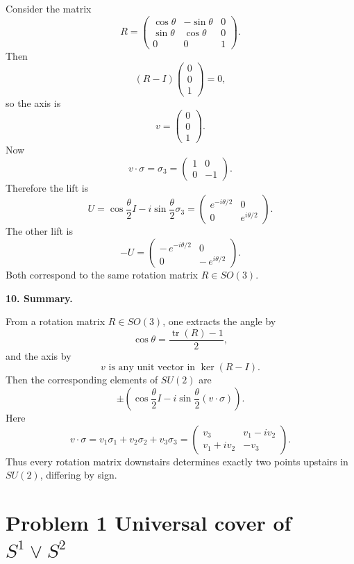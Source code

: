 \documentclass[12pt,a4paper]{article}
\theoremstyle{notespace}
\begin{document}
Consider the matrix
\[
R=
\begin{pmatrix}
	\cos\theta & -\sin\theta & 0\\
	\sin\theta & \cos\theta & 0\\
	0&0&1
\end{pmatrix}.
\]
Then
\[
(R-I)
\begin{pmatrix}
	0\\
	0\\
	1
\end{pmatrix}
=0,
\]
so the axis is
\[
v=
\begin{pmatrix}
	0\\
	0\\
	1
\end{pmatrix}.
\]
Now
\[
v\cdot \sigma = \sigma_3=
\begin{pmatrix}
	1&0\\
	0&-1
\end{pmatrix}.
\]
Therefore the lift is
\[
U=
\cos\frac{\theta}{2}I-i\sin\frac{\theta}{2}\sigma_3
=
\begin{pmatrix}
	e^{-i\theta/2} & 0\\
	0 & e^{i\theta/2}
\end{pmatrix}.
\]
The other lift is
\[
-U=
\begin{pmatrix}
	-\,e^{-i\theta/2} & 0\\
	0 & -\,e^{i\theta/2}
\end{pmatrix}.
\]
Both correspond to the same rotation matrix \(R\in SO(3)\).

\medskip

\textbf{10. Summary.}

From a rotation matrix \(R\in SO(3)\), one extracts the angle by
\[
\boxed{\cos\theta=\frac{\operatorname{tr}(R)-1}{2}},
\]
and the axis by
\[
\boxed{v\text{ is any unit vector in }\ker(R-I).}
\]
Then the corresponding elements of \(SU(2)\) are
\[
\boxed{
	\pm\left(
	\cos\frac{\theta}{2}I
	-
	i\sin\frac{\theta}{2}(v\cdot \sigma)
	\right).
}
\]
Here
\[
\boxed{
	v\cdot \sigma=v_1\sigma_1+v_2\sigma_2+v_3\sigma_3
	=
	\begin{pmatrix}
		v_3 & v_1-i v_2\\
		v_1+i v_2 & -v_3
	\end{pmatrix}.
}
\]
Thus every rotation matrix downstairs determines exactly two points upstairs in \(SU(2)\), differing by sign.

\section{Problem 1 Universal cover of \texorpdfstring{$S^1 \vee S^2$}{S1 vee S2}}
\end{document}
